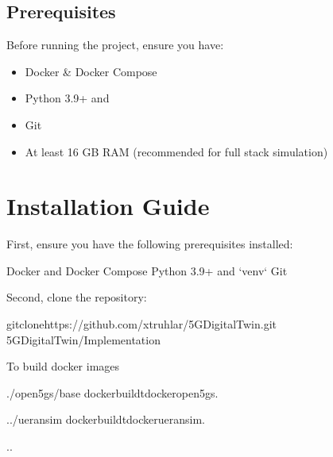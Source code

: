 \documentclass[letterpaper,10pt,english]{sphinxmanual}
\begin{document}
\section{Prerequisites}
\label{\detokenize{getting_started:prerequisites}}
\sphinxAtStartPar
Before running the project, ensure you have:
\begin{itemize}
\item {} 
\sphinxAtStartPar
Docker \& Docker Compose

\item {} 
\sphinxAtStartPar
Python 3.9+ and 

\item {} 
\sphinxAtStartPar
Git

\item {} 
\sphinxAtStartPar
At least 16 GB RAM (recommended for full stack simulation)

\end{itemize}

\sphinxstepscope


\chapter{Installation Guide}
\label{\detokenize{installation:installation-guide}}\label{\detokenize{installation::doc}}
\sphinxAtStartPar
First, ensure you have the following prerequisites installed:

\begin{sphinxVerbatim}[commandchars=\\\{\}]
Docker and Docker Compose
Python 3.9+ and `venv`
Git
\end{sphinxVerbatim}

\sphinxAtStartPar
Second, clone the repository:

\begin{sphinxVerbatim}[commandchars=\\\{\}]
gitclonehttps://github.com/xtruhlar/5GDigitalTwin.git
5GDigitalTwin/Implementation
\end{sphinxVerbatim}

\sphinxAtStartPar
To build docker images

\begin{sphinxVerbatim}[commandchars=\\\{\}]
./open5gs/base
dockerbuild\PYGZhy{}tdocker\PYGZus{}open5gs.

../ueransim
dockerbuild\PYGZhy{}tdocker\PYGZus{}ueransim.

..
\end{sphinxVerbatim}
\end{document}
